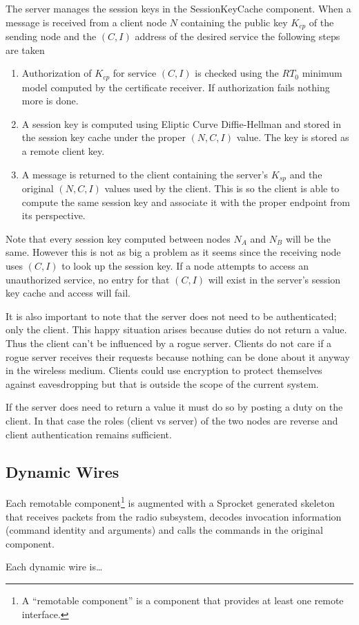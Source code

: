 The server manages the session keys in the SessionKeyCache component. When a message is received
from a client node $N$ containing the public key $K_{cp}$ of the sending node and the $(C, I)$
address of the desired service the following steps are taken

\begin{enumerate}
\item Authorization of $K_{cp}$ for service $(C, I)$ is checked using the $RT_0$ minimum model
  computed by the certificate receiver. If authorization fails nothing more is done.
\item A session key is computed using Eliptic Curve Diffie-Hellman and stored in the session key
  cache under the proper $(N, C, I)$ value. The key is stored as a remote client key.
\item A message is returned to the client containing the server's $K_{sp}$ and the original $(N,
  C, I)$ values used by the client. This is so the client is able to compute the same session
  key and associate it with the proper endpoint from its perspective.
\end{enumerate}

Note that every session key computed between nodes $N_A$ and $N_B$ will be the same. However
this is not as big a problem as it seems since the receiving node uses $(C, I)$ to look up the
session key. If a node attempts to access an unauthorized service, no entry for that $(C, I)$
will exist in the server's session key cache and access will fail.

It is also important to note that the server does not need to be authenticated; only the client.
This happy situation arises because duties do not return a value. Thus the client can't be
influenced by a rogue server. Clients do not care if a rogue server receives their requests
because nothing can be done about it anyway in the wireless medium. Clients could use encryption
to protect themselves against eavesdropping but that is outside the scope of the current system.

If the server does need to return a value it must do so by posting a duty on the client. In that
case the roles (client vs server) of the two nodes are reverse and client authentication remains
sufficient.

\subsection{Dynamic Wires}

Each remotable component\footnote{A ``remotable component'' is a component that provides at
least one remote interface.} is augmented with a Sprocket generated skeleton that receives
packets from the radio subsystem, decodes invocation information (command identity and
arguments) and calls the commands in the original component.

Each dynamic wire is\ldots

